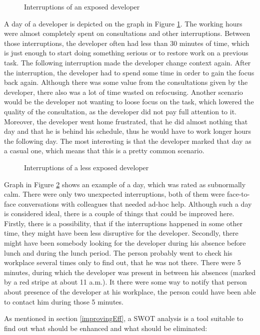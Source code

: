\documentclass[11pt,singleside]{myfithesis2}
\newcommand{\pict}[4]{
	\begin{figure}[h!]
  		\vspace{-7px}
  		\centerline{\fcolorbox{darkgray}{palegray}{\texttt{[image: \#2]}}}
  		\caption{#1}
  		\label{#4}
	\end{figure}
}
\begin{document}
\pict{Interruptions of an exposed developer}{data/originalStatesExposed.png}{width=0.8\textwidth}{pic:originalStatesExposed}

A day of a developer is depicted on the graph in Figure \ref{pic:originalStatesExposed}. The working hours were almost completely spent on consultations and other interruptions. Between those interruptions, the developer often had less than 30 minutes of time, which is just enough to start doing something serious or to restore work on a previous task. The following interruption made the developer change context again. After the interruption, the developer had to spend some time in order to gain the focus back again. Although there was some value from the consultations given by the developer, there also was a lot of time wasted on refocusing. Another scenario would be the developer not wanting to loose focus on the task, which lowered the quality of the consultation, as the developer did not pay full attention to it. Moreover, the developer went home frustrated, that he did almost nothing that day and that he is behind his schedule, thus he would have to work longer hours the following day. The most interesting is that the developer marked that day as a casual one, which means that this is a pretty common scenario.

\pict{Interruptions of a less exposed developer}{data/originalStatesNormal.png}{width=0.8\textwidth}{pic:originalStatesNormal}

Graph in Figure \ref{pic:originalStatesNormal} shows an example of a day, which was rated as subnormally calm. There were only two unexpected interruptions, both of them were face-to-face conversations with colleagues that needed ad-hoc help. Although such a day is considered ideal, there is a couple of things that could be improved here. Firstly, there is a possibility, that if the interruptions happened in some other time, they might have been less disruptive for the developer. Secondly, there might have been somebody looking for the developer during his absence before lunch and during the lunch period. The person probably went to check his workplace several times only to find out, that he was not there. There were 5 minutes, during which the developer was present in between his absences (marked by a red stripe at about 11 a.m.). It there were some way to notify that person about presence of the developer at his workplace, the person could have been able to contact him during those 5 minutes.

As mentioned in section \ref{improvingEff}, a SWOT analysis is a tool suitable to find out what should be enhanced and what should be eliminated:
\end{document}
